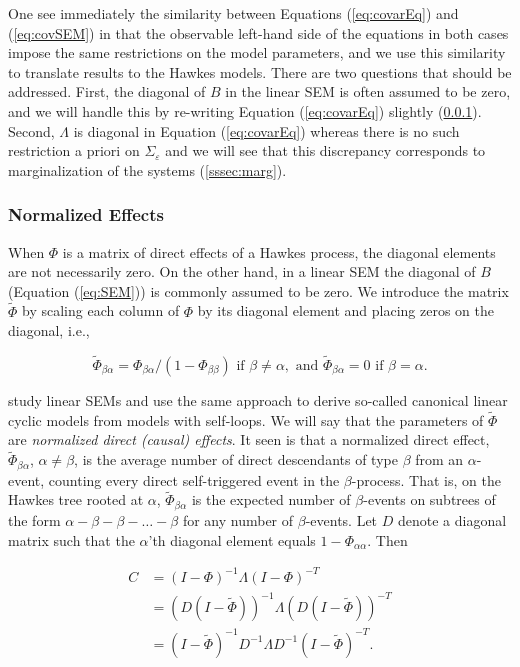 \documentclass[accepted]{uai2021} %
\begin{document}
One see immediately the similarity between Equations (\ref{eq:covarEq}) 
and (\ref{eq:covSEM}) in that the observable left-hand side of the equations in 
both cases impose the same restrictions on the model parameters, and we use 
this similarity to translate results to the Hawkes models. There are two 
questions that should be addressed. First, the diagonal of $B$ in 
the linear SEM is often assumed to be zero, and we will handle this by 
re-writing 
Equation (\ref{eq:covarEq}) slightly (\ref{sssec:normEff}). Second, $\Lambda$ 
is diagonal in Equation (\ref{eq:covarEq}) whereas there is no such restriction 
a priori on $\Sigma_\varepsilon$ and we will see that this discrepancy 
corresponds to marginalization of the systems (\ref{sssec:marg}).


\subsubsection{Normalized Effects}
\label{sssec:normEff}

When $\Phi$ is a matrix of direct effects of a Hawkes process, the diagonal 
elements are not necessarily zero. On the other hand, in a linear SEM the 
diagonal of $B$ 
(Equation (\ref{eq:SEM})) is commonly assumed to be zero. We introduce 
the matrix $\tilde{\Phi}$ by scaling each column of $\Phi$ by its 
diagonal element and placing zeros on the diagonal, i.e.,

$$
\tilde{\Phi}_{\beta\alpha} = \Phi_{\beta\alpha}/(1-\Phi_{\beta\beta})  \text{ 
if } \beta\neq \alpha, \text{ and } 
\tilde{\Phi}_{\beta\alpha} 
= 0 \text{ if } \beta= \alpha.
$$

\cite{hyttinen2012} study linear SEMs and use the same approach to derive 
so-called canonical linear 
cyclic models from models with self-loops. We 
will say that the parameters of $\tilde{\Phi}$ are \emph{normalized direct
(causal) effects}. It seen is that a normalized direct effect, 
$\tilde{\Phi}_{\beta\alpha}$, $\alpha\neq\beta$, is the average number of 
direct 
descendants of type 
$\beta$ from an $\alpha$-event, counting every direct self-triggered event in 
the $\beta$-process. 
That is, on the Hawkes tree rooted at $\alpha$, $\tilde{\Phi}_{\beta\alpha}$ is 
the expected number of $\beta$-events on subtrees of the form $\alpha - \beta - 
\beta - \ldots - 
\beta$ for any number of $\beta$-events. 
Let $D$ denote a 
diagonal matrix such that the $\alpha$'th diagonal element equals 
$1 - \Phi_{\alpha\alpha}$. Then

\begin{align*}
C & = (I - \Phi)^{-1}\Lambda (I - \Phi)^{-T}  \\
& = (D(I - \tilde{\Phi}))^{-1}\Lambda (D(I - \tilde{\Phi}))^{-T} \\
& = (I - \tilde{\Phi})^{-1}D^{-1} \Lambda D^{-1}(I - 
\tilde{\Phi})^{-T}.
\label{eq:Gtilde}
\end{align*}
\end{document}
